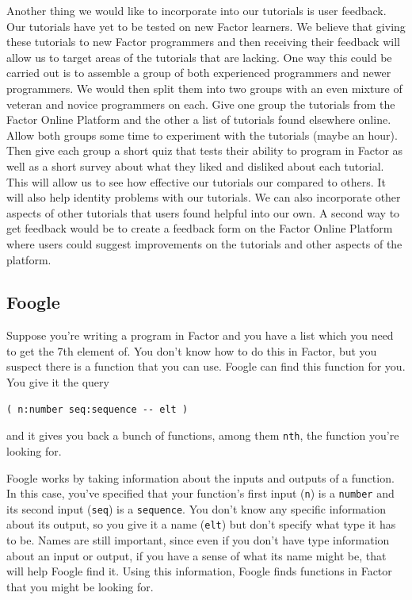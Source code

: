 \documentclass[
]{article}
\begin{document}
Another thing we would like to incorporate into our tutorials is user
feedback. Our tutorials have yet to be tested on new Factor learners. We
believe that giving these tutorials to new Factor programmers and then
receiving their feedback will allow us to target areas of the tutorials
that are lacking. One way this could be carried out is to assemble a
group of both experienced programmers and newer programmers. We would
then split them into two groups with an even mixture of veteran and
novice programmers on each. Give one group the tutorials from the Factor
Online Platform and the other a list of tutorials found elsewhere
online. Allow both groups some time to experiment with the tutorials
(maybe an hour). Then give each group a short quiz that tests their
ability to program in Factor as well as a short survey about what they
liked and disliked about each tutorial. This will allow us to see how
effective our tutorials our compared to others. It will also help
identity problems with our tutorials. We can also incorporate other
aspects of other tutorials that users found helpful into our own. A
second way to get feedback would be to create a feedback form on the
Factor Online Platform where users could suggest improvements on the
tutorials and other aspects of the platform.

\hypertarget{foogle}{%
\subsection{Foogle}\label{foogle}}

Suppose you're writing a program in Factor and you have a list which you
need to get the 7th element of. You don't know how to do this in Factor,
but you suspect there is a function that you can use. Foogle can find
this function for you. You give it the query

\begin{verbatim}
( n:number seq:sequence -- elt )
\end{verbatim}

and it gives you back a bunch of functions, among them \texttt{nth}, the
function you're looking for.

Foogle works by taking information about the inputs and outputs of a
function. In this case, you've specified that your function's first
input (\texttt{n}) is a \texttt{number} and its second input
(\texttt{seq}) is a \texttt{sequence}. You don't know any specific
information about its output, so you give it a name (\texttt{elt}) but
don't specify what type it has to be. Names are still important, since
even if you don't have type information about an input or output, if you
have a sense of what its name might be, that will help Foogle find it.
Using this information, Foogle finds functions in Factor that you might
be looking for.
\end{document}
